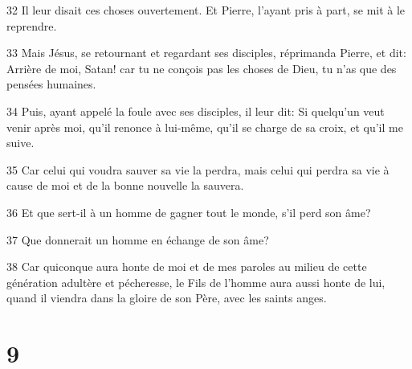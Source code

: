 \par 32 Il leur disait ces choses ouvertement. Et Pierre, l'ayant pris à part, se mit à le reprendre.
\par 33 Mais Jésus, se retournant et regardant ses disciples, réprimanda Pierre, et dit: Arrière de moi, Satan! car tu ne conçois pas les choses de Dieu, tu n'as que des pensées humaines.
\par 34 Puis, ayant appelé la foule avec ses disciples, il leur dit: Si quelqu'un veut venir après moi, qu'il renonce à lui-même, qu'il se charge de sa croix, et qu'il me suive.
\par 35 Car celui qui voudra sauver sa vie la perdra, mais celui qui perdra sa vie à cause de moi et de la bonne nouvelle la sauvera.
\par 36 Et que sert-il à un homme de gagner tout le monde, s'il perd son âme?
\par 37 Que donnerait un homme en échange de son âme?
\par 38 Car quiconque aura honte de moi et de mes paroles au milieu de cette génération adultère et pécheresse, le Fils de l'homme aura aussi honte de lui, quand il viendra dans la gloire de son Père, avec les saints anges.

\chapter{9}

